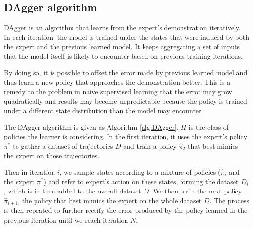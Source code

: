 \documentclass[twoside]{article}
\begin{document}


\subsection{DAgger algorithm}
DAgger is an algorithm that learns from the expert's demonstration iteratively. In each iteration, the model is trained under the states that were induced by both the expert and the previous learned model. It keeps aggregating a set of inputs that the model itself is likely to encounter based on previous training iterations.  

By doing so, it is possible to offset the error made by previous learned model and thus learn a new policy that approaches the demonstration better. This is a remedy to the problem in naive supervised learning that the error may grow quadratically and results may become unpredictable because the policy is trained under a different state distribution than the model may encounter. 

The DAgger algorithm is given as Algorithm \ref{alg:DAgger}.
$\Pi$ is the class of policies the learner is considering.
In the first iteration, it uses the expert's policy $\pi^*$ to gather
a dataset of trajectories $D$ and train a policy $\hat{\pi}_2$ that best mimics the expert on those trajectories. 

Then in iteration $i$, we sample states according to a mixture of policies ($\hat{\pi}_i$ and the expert $\pi^*$) and refer to expert's action on these states, forming the dataset $D_i$, which is in turn added to the overall dataset $D$. We then train the next policy $\hat{\pi}_{i+1}$, the policy that best mimics the expert on the whole dataset $D$. The process is then repeated to further rectify the error produced by the policy learned in the previous iteration until we reach iteration $N$.

\end{document}
